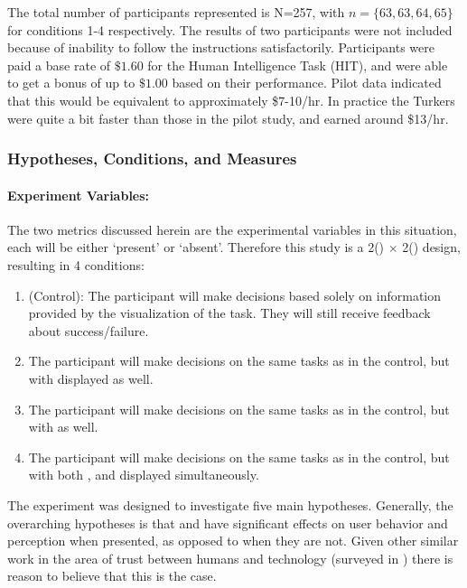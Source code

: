     The total number of participants represented is N=257, with $n=\{63,63,64,65\}$ for conditions 1-4 respectively. The results of two participants were not included because of inability to follow the instructions satisfactorily. Participants were paid a base rate of $\$1.60$ for the Human Intelligence Task (HIT), and were able to get a bonus of up to $\$1.00$ based on their performance. Pilot data indicated that this would be equivalent to approximately \$7-10/hr. In practice the Turkers were quite a bit faster than those in the pilot study, and earned around \$13/hr.

    \subsubsection{Hypotheses, Conditions, and Measures} \label{sec:hyp_cond_meas}
    \paragraph{Experiment Variables:}
    The two \famsec{} metrics discussed herein are the experimental variables in this situation, each will be either `present' or `absent'. Therefore this study is a 2(\xQ) $\times$ 2(\xO) design, resulting in 4 conditions:

    \begin{enumerate}[label=\textbf{C\arabic*}]
        \item (Control): The participant will make decisions based solely on information provided by the visualization of the task. They will still receive feedback about success/failure. \label{itm:C1}
        \item The participant will make decisions on the same tasks as in the control, but with \xQ{} displayed as well.\label{itm:C2}
        \item The participant will make decisions on the same tasks as in the control, but with \xO{} as well. \label{itm:C3}
        \item The participant will make decisions on the same tasks as in the control, but with both \xQ{}, and \xO{} displayed simultaneously. \label{itm:C4}
    \end{enumerate}

    The experiment was designed to investigate five main hypotheses. Generally, the overarching hypotheses is that \xQ{} and \xO{} have significant effects on user behavior and perception when presented, as opposed to when they are not. Given other similar work in the area of trust between humans and technology (surveyed in \cite{Israelsen2017-ym}) there is reason to believe that this is the case.

